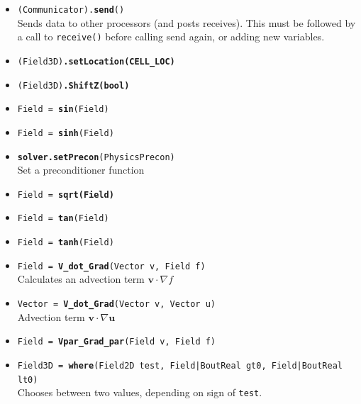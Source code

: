 \documentclass[12pt]{article}
\newcommand{\code}[1]{\texttt{#1}}
\begin{document}
\begin{itemize}
  \item \texttt{(Communicator).{\bf{send}}()} \\
    Sends data to other processors (and posts receives). This must be followed
    by a call to \code{receive()} before calling send again, or adding new
    variables.
  \item \texttt{(Field3D)\bf{.setLocation}(CELL\_LOC)}
  \item \texttt{(Field3D)\bf{.ShiftZ}(bool)}
  \item \texttt{Field = {\bf{sin}}(Field)}
  \item \texttt{Field = {\bf{sinh}}(Field)}
  \item \texttt{{\bf solver.setPrecon}(PhysicsPrecon)} \\ Set a preconditioner
      function
  \item \texttt{Field = \bf{sqrt}(Field)}
  \item \texttt{Field = {\bf tan}(Field)}
  \item \texttt{Field = {\bf tanh}(Field)}
  \item \texttt{Field = {\bf V\_dot\_Grad}(Vector v, Field f)} \\ Calculates an
      advection term $\mathbf{v}\cdot\nabla f$
  \item \texttt{Vector = {\bf V\_dot\_Grad}(Vector v, Vector u)} \\
    Advection term $\mathbf{v}\cdot\nabla\mathbf{u}$
  \item \texttt{Field = {\bf Vpar\_Grad\_par}(Field v, Field f)}
  \item \texttt{Field3D = {\bf where}(Field2D test, Field|BoutReal gt0,
      Field|BoutReal lt0)} \\ Chooses between two values, depending on sign of
      \code{test}.
\end{itemize}
%
\end{document}
